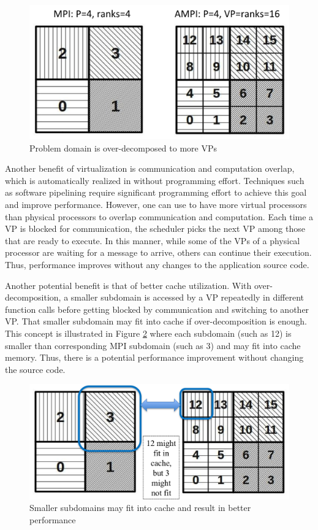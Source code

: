 \documentclass[10pt]{article}
\begin{document}
\begin{figure}[h]
\centering
\includegraphics[width=4.6in]{figs/prac.png}
\caption{Problem domain is over-decomposed to more VPs}
\label{fig_prac}
\end{figure}

Another benefit of virtualization is communication and computation overlap, which
is automatically realized in \ampi{} without programming effort.
Techniques such as software pipelining require significant programming
effort to achieve this goal and improve performance. However, one can use \ampi{}
to have more virtual processors than physical processors to overlap communication
and computation. Each time a VP is blocked for communication, the \charmpp{}
scheduler picks the next VP among those that are ready to execute. In this
manner, while some of the VPs of a physical processor are waiting for a message
to arrive, others can continue their execution. Thus, performance improves
without any changes to the application source code.

Another potential benefit is that of better cache utilization. With
over-decomposition, a smaller subdomain is accessed by a VP repeatedly
in different function calls before getting blocked by communication and
switching to another VP. That smaller subdomain may fit into cache if
over-decomposition is enough. This concept is illustrated in Figure
\ref{fig_cache} where each \ampi{} subdomain (such as 12) is smaller than
corresponding MPI subdomain (such as 3) and may fit into cache memory. Thus,
there is a potential performance improvement without changing the source code.

\begin{figure}[h]
\centering
\includegraphics[width=4.6in]{figs/cache.png}
\caption{Smaller subdomains may fit into cache and result in better performance}
\label{fig_cache}
\end{figure}
\end{document}
